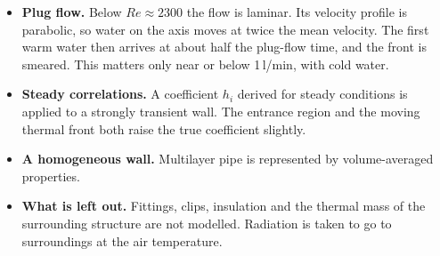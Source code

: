 \documentclass[a4paper,justified]{tufte-handout}
\newcommand{\lpm}{\,l/min}
\begin{document}
\begin{itemize}
  \item \textbf{Plug flow.} Below $Re\approx2300$ the flow is laminar. Its
    velocity profile is parabolic, so water on the axis moves at twice the mean
    velocity. The first warm water then arrives at about half the plug-flow
    time, and the front is smeared. This matters only near or below 1\lpm{},
    with cold water.
  \item \textbf{Steady correlations.} A coefficient $h_i$ derived for steady
    conditions is applied to a strongly transient wall. The entrance region and
    the moving thermal front both raise the true coefficient slightly.
  \item \textbf{A homogeneous wall.} Multilayer pipe is represented by
    volume-averaged properties.
  \item \textbf{What is left out.} Fittings, clips, insulation and the thermal
    mass of the surrounding structure are not modelled. Radiation is taken to
    go to surroundings at the air temperature.
\end{itemize}

\vspace{1em}
\end{document}
